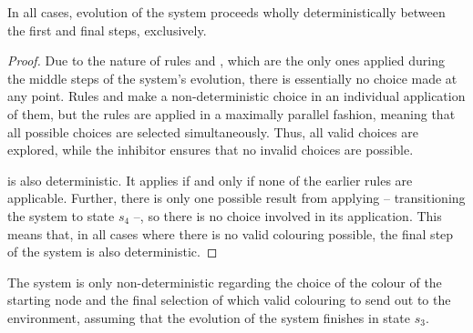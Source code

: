 \begin{lemma}\label{lemma:gcol:determin}
In all cases, evolution of the system proceeds wholly deterministically between the first and final steps, exclusively.
\end{lemma}

\begin{proof}
Due to the nature of rules  and , which are the only ones applied during the middle steps of the system's evolution, there is essentially no choice made at any point.  Rules  and  make a non-deterministic choice in an individual application of them, but the rules are applied in a maximally parallel fashion, meaning that all possible choices are selected simultaneously.  Thus, all valid choices are explored, while the inhibitor ensures that no invalid choices are possible.


 is also deterministic.  It applies if and only if none of the earlier rules are applicable.  Further, there is only one possible result from applying  -- transitioning the system to state \(s_4\) --, so there is no choice involved in its application.  This means that, in all cases where there is no valid colouring possible, the final step of the system is also deterministic.

\end{proof}

\begin{lemma}\label{lemma:gcol:nondet}

The system is only non-deterministic regarding the choice of the colour of the starting node and the final selection of which valid colouring to send out to the environment, assuming that the evolution of the system finishes in state \(s_3\).
\end{lemma}

